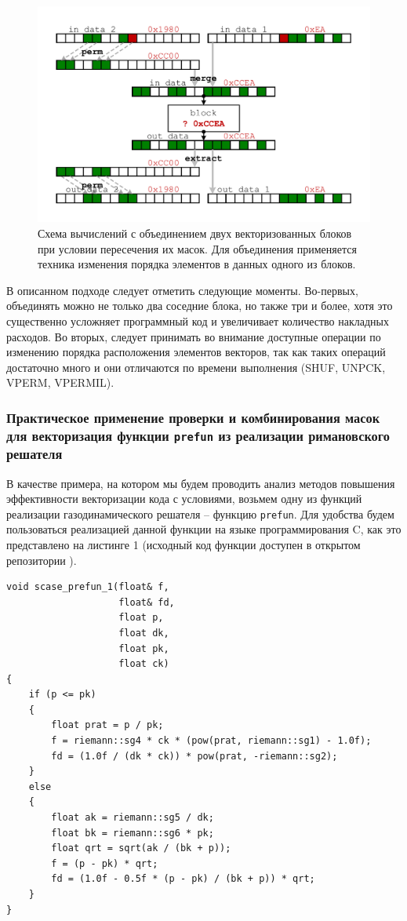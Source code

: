 \begin{figure}[ht]
	\centering
		\includegraphics[width=1.0\textwidth]{./pics/text_4_vec_comb_mask/comb_masks_perm.pdf}
	\caption{Схема вычислений с объединением двух векторизованных блоков при условии пересечения их масок. Для объединения применяется техника изменения порядка элементов в данных одного из блоков.}
	\label{fig:text_4_vec_comb_mask_comb_masks_perm}
\end{figure}

В описанном подходе следует отметить следующие моменты.
Во-первых, объединять можно не только два соседние блока, но также три и более, хотя это существенно усложняет программный код и увеличивает количество накладных расходов.
Во вторых, следует принимать во внимание доступные операции по изменению порядка расположения элементов векторов, так как таких операций достаточно много и они отличаются по времени выполнения (SHUF, UNPCK, VPERM, VPERMIL).

\subsubsection{Практическое применение проверки и комбинирования масок для векторизация функции \texttt{prefun} из реализации римановского решателя}

В качестве примера, на котором мы будем проводить анализ методов повышения эффективности векторизации кода с условиями, возьмем одну из функций реализации газодинамического решателя -- функцию \texttt{prefun}.
Для удобства будем пользоваться реализацией данной функции на языке программирования C, как это представлено на листинге 1 (исходный код функции доступен в открытом репозитории ).

\begin{lstlisting}[caption={caption},label={label}]
void scase_prefun_1(float& f,
                    float& fd,
                    float p,
                    float dk,
                    float pk,
                    float ck)
{
    if (p <= pk)
    {
        float prat = p / pk;
        f = riemann::sg4 * ck * (pow(prat, riemann::sg1) - 1.0f);
        fd = (1.0f / (dk * ck)) * pow(prat, -riemann::sg2);
    }
    else
    {
        float ak = riemann::sg5 / dk;
        float bk = riemann::sg6 * pk;
        float qrt = sqrt(ak / (bk + p));
        f = (p - pk) * qrt;
        fd = (1.0f - 0.5f * (p - pk) / (bk + p)) * qrt;
    }
}
\end{lstlisting}

